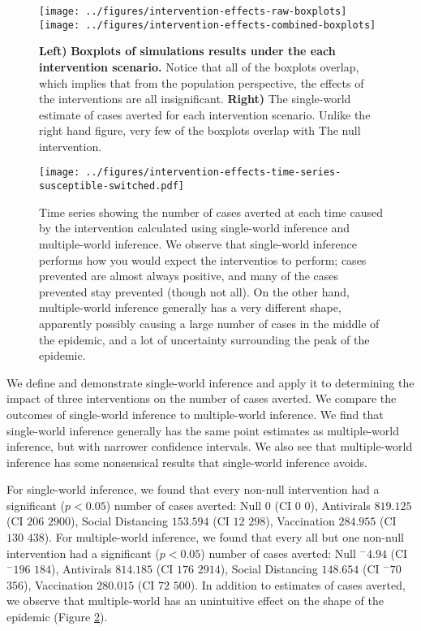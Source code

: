 \documentclass[PTRSB]{rsos}
\makeatletter
\renewcommand{\neg}{{}^-}
\def\checkGraphicsWidth{\ifdim\Gin@nat@width>\linewidth
	\tsGraphicsScaleX\linewidth\else\Gin@nat@width\fi}
\let\ts@includegraphics\includegraphics
\renewcommand{\includegraphics}[1]{\ts@includegraphics[width=\checkGraphicsWidth]{#1}}
\makeatother
\begin{document}
\begin{multicols}{2}
\begin{figure}
\centering
\texttt{[image: ../figures/intervention-effects-raw-boxplots]}
\texttt{[image: ../figures/intervention-effects-combined-boxplots]}
\caption{\textbf{Left)} \textbf{Boxplots of simulations results under the each intervention scenario.}  Notice that all of the boxplots overlap, which implies that from the population perspective, the effects of the interventions are all insignificant.  \textbf{Right)} The single-world estimate of cases averted for each intervention scenario.  Unlike the right hand figure, very few of the boxplots overlap with The null intervention.}
\label{fig:boxplots}
\end{figure}

\begin{figure}
\centering
\texttt{[image: ../figures/intervention-effects-time-series-susceptible-switched.pdf]}
\caption{Time series showing the number of cases averted at each time caused by the intervention calculated using single-world inference and multiple-world inference.  We observe that single-world inference performs how you would expect the interventios to perform; cases prevented are almost always positive, and many of the cases prevented stay prevented (though not all). On the other hand, multiple-world inference generally has a very different shape, apparently possibly causing a large number of cases in the middle of the epidemic, and a lot of uncertainty surrounding the peak of the epidemic.}
\label{fig:epicurve}
\end{figure}

We define and demonstrate single-world inference and apply it to determining the impact of three interventions on the number of cases averted.
We compare the outcomes of single-world inference to multiple-world inference.
We find that single-world inference generally has the same point estimates as multiple-world inference, but with narrower confidence intervals.
We also see that multiple-world inference has some nonsensical results that single-world inference avoids.

For single-world inference, we found that every non-null intervention had a significant ($p<0.05$) number of cases averted: Null $ 0 $ (CI $ 0 $ \textemdash $ 0 $), Antivirals $ 819.125 $ (CI $ 206 $ \textemdash $ 2900 $), Social Distancing $ 153.594 $ (CI $ 12 $ \textemdash $ 298 $), Vaccination $ 284.955 $ (CI $ 130 $ \textemdash $ 438 $).
For multiple-world inference, we found that every all but one non-null intervention had a significant ($p<0.05$) number of cases averted: Null $ \neg4.94 $ (CI $ \neg196 $ \textemdash $ 184 $), Antivirals $ 814.185 $ (CI $ 176 $ \textemdash $ 2914 $), Social Distancing $ 148.654 $ (CI $ \neg70 $ \textemdash $ 356 $), Vaccination $ 280.015 $ (CI $ 72 $ \textemdash $ 500 $).
In addition to estimates of cases averted, we observe that multiple-world has an unintuitive effect on the shape of the epidemic (Figure \ref{fig:epicurve}).


\end{multicols}
\end{document}
